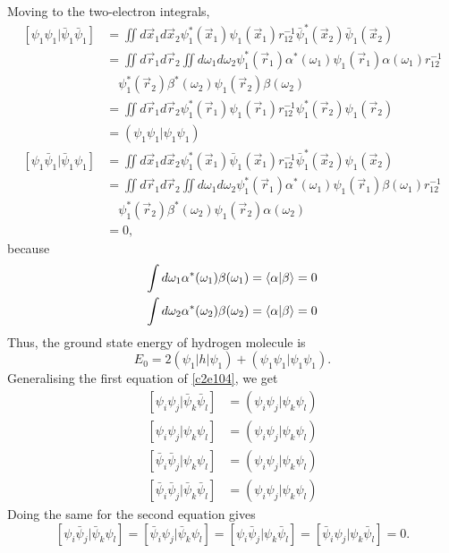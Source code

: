Moving to the two-electron integrals,
\begin{equation}\label{c2e104}
\begin{aligned}
[\psi_1\psi_1|\bar{\psi}_1\bar{\psi}_1] &= \iint d\vec{x}_1 d\vec{x}_2
\psi_1^\ast(\vec{x}_1)\psi_1(\vec{x}_1)r_{12}^{-1}
\bar{\psi}_1^\ast(\vec{x}_2)\bar{\psi}_1 (\vec{x}_2) \\
 &= \iint d\vec{r}_1 d\vec{r}_2 \iint d\omega_1 d\omega_2\psi_1^\ast(\vec{r}_1)
 \alpha^\ast(\omega_1)\psi_1(\vec{r}_1)\alpha(\omega_1)r_{12}^{-1}\\
 &\quad \psi_1^\ast(\vec{r}_2)\beta^\ast(\omega_2)\psi_1(\vec{r}_2)
 \beta(\omega_2) \\
 &= \iint d\vec{r}_1 d\vec{r}_2\psi_1^\ast(\vec{r}_1)\psi_1(\vec{r}_1)r_{12}^{-1}
 \psi_1^\ast(\vec{r}_2)\psi_1(\vec{r}_2) \\
 &= (\psi_1\psi_1|\psi_1\psi_1) \\
[\psi_1\bar{\psi}_1|\bar{\psi}_1\psi_1] &= \iint d\vec{x}_1 d\vec{x}_2
\psi_1^\ast(\vec{x}_1)\bar{\psi}_1(\vec{x}_1)r_{12}^{-1}
\bar{\psi}_1^\ast(\vec{x}_2)\psi_1(\vec{x}_2) \\
 &= \iint d\vec{r}_1 d\vec{r}_2 \iint d\omega_1 d\omega_2 \psi_1^\ast(\vec{r}_1)
 \alpha^\ast(\omega_1)\psi_1(\vec{r}_1)\beta(\omega_1) r_{12}^{-1} \\
&\quad\psi_1^\ast(\vec{r}_2)\beta^\ast(\omega_2)\psi_1(\vec{r}_2)\alpha(\omega_2)\\
 &= 0,
\end{aligned}
\end{equation}
because
\[
\begin{aligned}
\int d\omega_1 \alpha^\ast(\omega_1)\beta(\omega_1) &= \braket{\alpha|\beta}=0\\
\int d\omega_2 \alpha^\ast(\omega_2)\beta(\omega_2) &= \braket{\alpha|\beta}=0
\end{aligned}
\]
Thus, the ground state energy of hydrogen molecule is
\begin{equation}\label{c2e105}
E_0 = 2(\psi_1|h|\psi_1) + (\psi_1\psi_1|\psi_1\psi_1).
\end{equation}
Generalising the first equation of \eqref{c2e104}, we get
\begin{equation}\label{c2e106}
\begin{aligned}
[\psi_i\psi_j|\bar{\psi}_k\bar{\psi}_l] &= (\psi_i\psi_j|\psi_k\psi_l) \\
[\psi_i\psi_j|\psi_k\psi_l] &= (\psi_i\psi_j|\psi_k\psi_l) \\
[\bar{\psi}_i\bar{\psi}_j|\psi_k\psi_l] &= (\psi_i\psi_j|\psi_k\psi_l) \\
[\bar{\psi}_i\bar{\psi}_j|\bar{\psi}_k\bar{\psi}_l] &= (\psi_i\psi_j|\psi_k\psi_l)
\end{aligned}
\end{equation}
Doing the same for the second equation gives
\begin{equation}\label{c2e107}
[\psi_i\bar{\psi}_j|\bar{\psi}_k\psi_l]=[\bar{\psi}_i\psi_j|\bar{\psi}_k\psi_l]=
[\psi_i\bar{\psi}_j|\psi_k\bar{\psi}_l]=[\bar{\psi}_i\psi_j|\psi_k\bar{\psi}_l]=0.
\end{equation}

